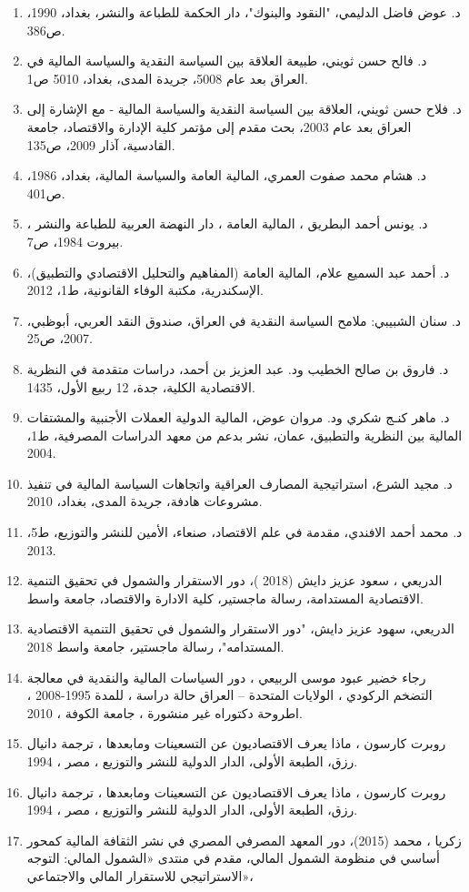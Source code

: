 \documentclass[10pt,a4paper]{report}
\begin{document}
\begin{enumerate}
	\item د. عوض فاضل الدليمي، "النقود والبنوك"، دار الحكمة للطباعة والنشر، بغداد، 1990، ص386.
	\item د. فالح حسن ثويني، طبيعة العلاقة بين السياسة النقدية والسياسة المالية في العراق بعد عام 5008، جريدة المدى، بغداد، 5010 ص1.
	\item د. فلاح حسن ثويني، العلاقة بين السياسة النقدية والسياسة المالية - مع الإشارة إلى العراق بعد عام 2003، بحث مقدم إلى مؤتمر كلية الإدارة والاقتصاد، جامعة القادسية، آذار 2009، ص135.
	\item د. هشام محمد صفوت العمري، المالية العامة والسياسة المالية، بغداد، 1986، ص401.
	\item د. يونس أحمد البطريق ، المالية العامة ، دار النهضة العربية للطباعة والنشر ، بيروت 1984، ص7.
	\item د. أحمد عبد السميع علام، المالية العامة (المفاهيم والتحليل الاقتصادي والتطبيق)، الإسكندرية، مكتبة الوفاء القانونية، ط1، 2012.
	\item د. سنان الشبيبي: ملامح السياسة النقدية في العراق، صندوق النقد العربي، أبوظبي، 2007، ص25.
	\item د. فاروق بن صالح الخطيب ود. عبد العزيز بن أحمد، دراسات متقدمة في النظرية الاقتصادية الكلية، جدة، 12 ربيع الأول، 1435.
	\item د. ماهر كنـج شكري ود. مروان عوض، المالية الدولية العملات الأجنبية والمشتقات المالية بين النظرية والتطبيق، عمان، نشر بدعم من معهد الدراسات المصرفية، ط1، 2004.
	\item د. مجيد الشرع، استراتيجية المصارف العراقية واتجاهات السياسة المالية في تنفيذ مشروعات هادفة، جريدة المدى، بغداد، 2010.
	\item د. محمد أحمد الافندي، مقدمة في علم الاقتصاد، صنعاء، الأمين للنشر والتوزيع، ط5، 2013.
	    \item الدريعي ، سعود عزيز دايش (2018 )، دور الاستقرار والشمول في تحقيق التنمية الاقتصادية المستدامة، رسالة ماجستير، كلية الادارة والاقتصاد، جامعة واسط.
	\item الدريعي، سهود عزيز دايش، "دور الاستقرار والشمول في تحقيق التنمية الاقتصادية المستدامه"، رسالة ماجستير، جامعة واسط 2018.
	\item رجاء خضير عبود موسى الربيعي ، دور السياسات المالية والنقدية في معالجة التضخم الركودي ، الولايات المتحدة – العراق حالة دراسة ، للمدة 1995-2008 ، اطروحة دكتوراه غير منشورة ، جامعة الكوفة ، 2010.
	\item روبرت كارسون ، ماذا يعرف الاقتصاديون عن التسعينات ومابعدها ، ترجمة دانيال رزق، الطبعة الأولى، الدار الدولية للنشر والتوزيع ، مصر ، 1994.
	\item روبرت كارسون ، ماذا يعرف الاقتصاديون عن التسعينات ومابعدها ، ترجمة دانيال رزق، الطبعة الأولى، الدار الدولية للنشر والتوزيع ، مصر ، 1994.
	\item زكريا ، محمد (2015)، دور المعهد المصرفي المصري في نشر الثقافة المالية كمحور أساسي في منظومة الشمول المالي، مقدم في منتدى «الشمول المالي: التوجه الاستراتيجي للاستقرار المالي والاجتماعي»، 
	

\end{enumerate}
\end{document}
